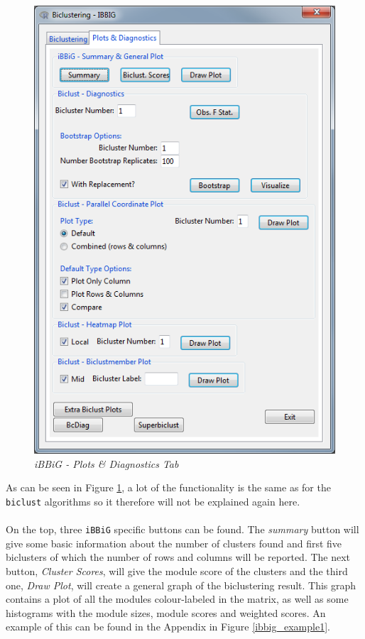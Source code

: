 \documentclass[a4paper]{article}\usepackage[]{graphicx}\usepackage[]{color}
\begin{document}
\begin{figure}[H]
\centering
\includegraphics[scale=0.5]{figures/ibbig_plotdiagtab.png}
\caption{{\it iBBiG - Plots \& Diagnostics Tab}\label{ibbig_plotdiagtab}}
\end{figure}
\noindent As can be seen in Figure \ref{ibbig_plotdiagtab}, a lot of the
functionality is the same as for the \verb|biclust| algorithms so it therefore
will not be explained again here.\\ \\
On the top, three \verb|iBBiG| specific buttons can be found. The {\it
summary} button will give some basic information about the number of clusters found and
first five biclusters of which the number of rows and columns will be reported.
The next button, {\it Cluster Scores}, will give the module score of the clusters 
and the third one, {\it Draw Plot}, will create a general graph of the
biclustering result. This graph contains a plot of all the modules
colour-labeled in the matrix, as well as some histograms with the module sizes,
module scores and weighted scores. An example of this can be found in the
Appendix in Figure \ref{ibbig_example1}.
\end{document}
